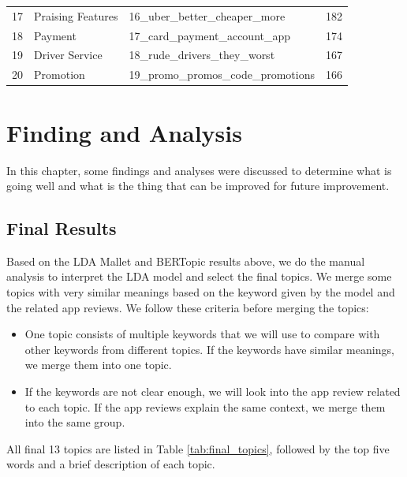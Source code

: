 \documentclass[12pt]{article}
\begin{document}
\begin{table}[!h]
\begin{tabular}{llll}
17          & Praising Features & 16\_uber\_better\_cheaper\_more            & 182             \\
18          & Payment           & 17\_card\_payment\_account\_app            & 174             \\
19          & Driver Service    & 18\_rude\_drivers\_they\_worst             & 167             \\
20          & Promotion         & 19\_promo\_promos\_code\_promotions        & 166   \\
\hline
\end{tabular}
\label{tab:bertopic_result}
\end{table}

\clearpage
\newpage
\section{Finding and Analysis}
In this chapter, some findings and analyses were discussed to determine what is going well and what is the thing that can be improved for future improvement.

\subsection{Final Results}
Based on the LDA Mallet and BERTopic results above, we do the manual analysis to interpret the LDA model and select the final topics. We merge some topics with very similar meanings based on the keyword given by the model and the related app reviews. We follow these criteria before merging the topics:

\begin{itemize}
\item One topic consists of multiple keywords that we will use to compare with other keywords from different topics. If the keywords have similar meanings, we merge them into one topic.
\item If the keywords are not clear enough, we will look into the app review related to each topic. If the app reviews explain the same context, we merge them into the same group.
\end{itemize}

All final 13 topics are listed in Table \ref{tab:final_topics}, followed by the top five words and a brief description of each topic.
\end{document}
